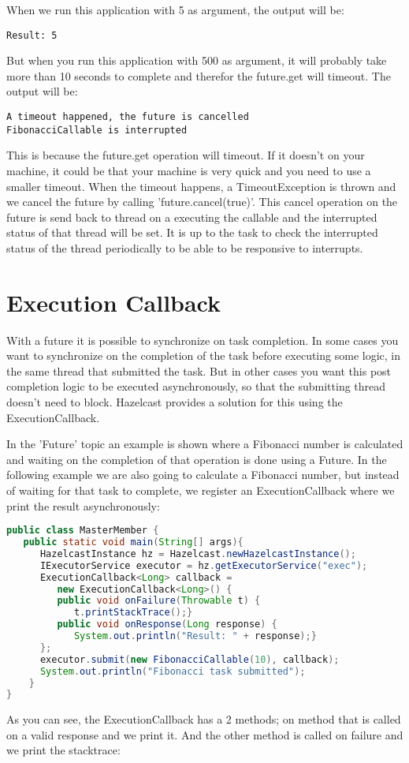 When we run this application with 5 as argument, the output will be: 
\begin{lstlisting}
Result: 5
\end{lstlisting}
But when you run this application with 500 as argument, it will probably take more than 10 seconds to complete and therefor the future.get will timeout. The output will be:
\begin{lstlisting}
A timeout happened, the future is cancelled
FibonacciCallable is interrupted
\end{lstlisting}
This is because the future.get operation will timeout. If it doesn't on your machine, it could be that your machine is very quick and you need to use a smaller timeout. When the timeout happens, a TimeoutException is thrown and we cancel the future by calling 'future.cancel(true)'. This cancel operation on the future is send back to thread on a executing the callable and the interrupted status of that thread will be set. It is up to the task to check the interrupted status of the thread periodically to be able to be responsive to interrupts.

\section{Execution Callback}
With a future it is possible to synchronize on task completion. In some cases you want to synchronize on the completion of the task before executing some logic, in the same thread that submitted the task. But in other cases you want this post completion logic to be executed asynchronously, so that the submitting thread doesn't need to block. Hazelcast provides a solution for this using the ExecutionCallback.

In the 'Future' topic an example is shown where a Fibonacci number is calculated and waiting on the completion of that operation is done using a Future. In the following example we are also going to calculate a Fibonacci number, but instead of waiting for that task to complete, we register an ExecutionCallback where we print the result asynchronously:
\begin{lstlisting}[language=java]
public class MasterMember {
   public static void main(String[] args){
      HazelcastInstance hz = Hazelcast.newHazelcastInstance();
      IExecutorService executor = hz.getExecutorService("exec");
      ExecutionCallback<Long> callback = 
         new ExecutionCallback<Long>() {
         public void onFailure(Throwable t) {
            t.printStackTrace();}
         public void onResponse(Long response) {
            System.out.println("Result: " + response);}
      };
      executor.submit(new FibonacciCallable(10), callback);
      System.out.println("Fibonacci task submitted");
    }
}
\end{lstlisting}
As you can see, the ExecutionCallback has a 2 methods; on method that is called on a valid response and we print it. And the other method is called on failure and we print the stacktrace: 

